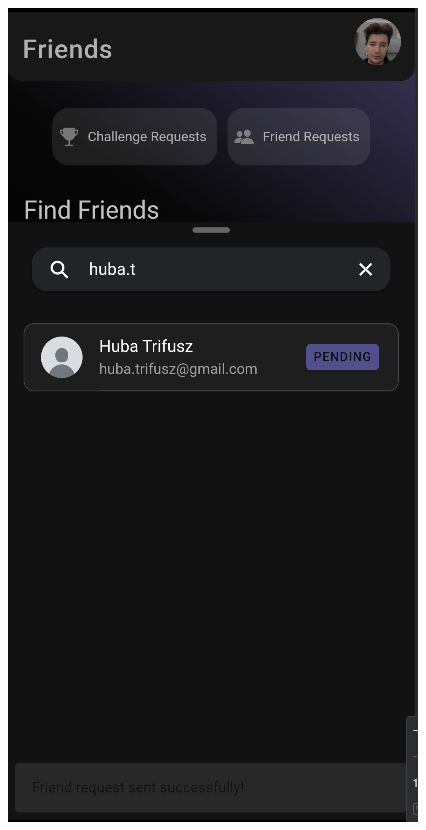 \documentclass[12pt]{report}
\begin{document}
\begin{figure}[H]
    \vspace{0.8em} %

    \begin{minipage}[b]{0.25\textwidth}
        \centering
        \includegraphics[width=\linewidth]{src/friends4.png}


\end{minipage}
\end{figure}
\end{document}
